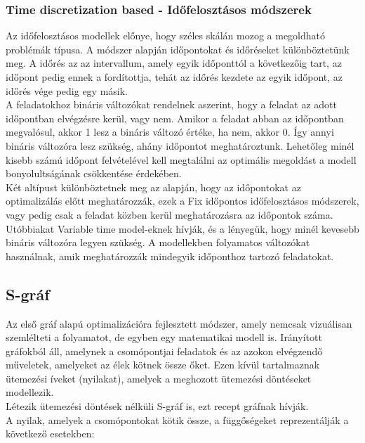\documentclass {report}
\begin{document}
  \subsubsection{Time discretization based - Időfelosztásos módszerek}
    Az időfelosztásos modellek előnye, hogy széles skálán mozog a megoldható problémák típusa.
  A módszer alapján időpontokat és időréseket különböztetünk meg. A időrés az az intervallum, amely egyik időponttól a következőig tart, az időpont pedig ennek a fordítottja, tehát az időrés kezdete az egyik időpont, az időrés vége pedig egy másik. \\
  A feladatokhoz bináris változókat rendelnek aszerint, hogy a feladat az adott időpontban elvégzésre kerül, vagy nem. Amikor a feladat abban az időpontban megvalósul, akkor 1 lesz a bináris változó értéke, ha nem, akkor 0. Így annyi bináris változóra lesz szükség, ahány időpontot meghatároztunk. Lehetőleg minél kisebb számú időpont felvételével kell megtalálni az optimális megoldást a modell bonyolultságának csökkentése érdekében.\\  
  
 Két altípust különböztetnek meg az alapján, hogy az időpontokat az optimalizálás előtt meghatározzák, ezek a Fix időpontos időfelosztásos módszerek, vagy pedig csak a feladat közben kerül meghatározásra az időpontok száma. Utóbbiakat Variable time model-eknek hívják, és a lényegük, hogy minél kevesebb bináris változóra legyen szükség. A modellekben folyamatos változókat használnak, amik meghatározzák mindegyik időponthoz tartozó feladatokat. 
 
 \subsection{S-gráf}
   Az első gráf alapú optimalizációra fejlesztett módszer, amely nemcsak vizuálisan szemlélteti a folyamatot, de egyben egy matematikai modell is. Irányított gráfokból áll, amelynek a csomópontjai feladatok és az azokon elvégzendő műveletek, amelyeket az élek kötnek össze őket. Ezen kívül tartalmaznak ütemezési íveket (nyilakat), amelyek a meghozott ütemezési döntéseket modellezik.\\
   Létezik ütemezési döntések nélküli S-gráf is, ezt recept gráfnak hívják. \\
   A nyilak,  amelyek a csomópontokat kötik össze, a függőségeket reprezentálják a következő esetekben:
\end{document}
